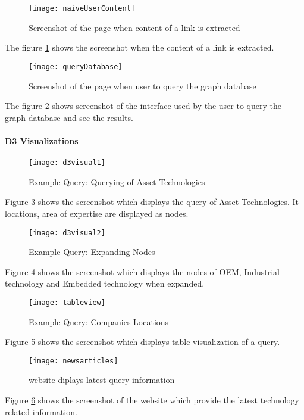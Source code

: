 \begin{figure}[h]
	\texttt{[image: naiveUserContent]}
	\centering
	\caption{Screenshot of the page when content of a link is extracted}
	\label{fig:naiveUserContent}
\end{figure}
The figure \ref{fig:naiveUserContent} shows the screenshot when the content of a link is extracted.

\begin{figure}[h]
	\texttt{[image: queryDatabase]}
	\centering
	\caption{Screenshot of the page when user to query the graph database}
	\label{fig:queryDatabase}
\end{figure}
The figure \ref{fig:queryDatabase} shows screenshot of the interface used by the user to query the graph database and see the results.
\paragraph*{D3 Visualizations}
\begin{figure}[h]
	\texttt{[image: d3visual1]}
	\centering
	\caption{Example Query: Querying of Asset Technologies}
	\label{fig:d3visual1}
\end{figure}
Figure \ref{fig:d3visual1} shows the screenshot which displays the query of Asset Technologies. It locations, area of expertise are displayed as nodes.
\begin{figure}[h]
	\texttt{[image: d3visual2]}
	\centering
	\caption{Example Query: Expanding Nodes}
	\label{fig:d3visual2}
\end{figure}
Figure \ref{fig:d3visual2} shows the screenshot which displays the nodes of OEM, Industrial technology and Embedded technology when expanded.

\begin{figure}[h]
	\texttt{[image: tableview]}
	\centering
	\caption{Example Query: Companies Locations}
	\label{fig:tableview}
\end{figure}
Figure \ref{fig:tableview} shows the screenshot which displays table visualization of a query.


\begin{figure}[h]
	\texttt{[image: newsarticles]}
	\centering
	\caption{website diplays latest query information}
	\label{fig:newsarticles}
\end{figure}
Figure \ref{fig:newsarticles} shows the screenshot of the website which provide the latest technology related information.